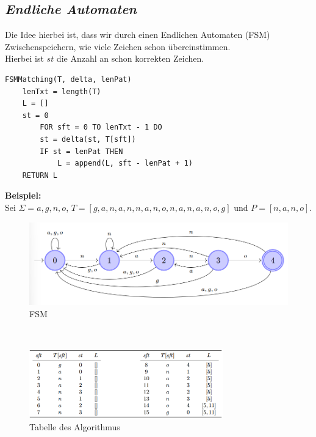 \documentclass{article}
\begin{document}
        \subsection{\textit{Endliche Automaten}}
            Die Idee hierbei ist, dass wir durch einen Endlichen Automaten (FSM) Zwischenspeichern, wie viele Zeichen schon übereinstimmen. \\
            Hierbei ist $st$ die Anzahl an schon korrekten Zeichen. 
            \begin{lstlisting}[style=pseudocode]
FSMMatching(T, delta, lenPat)
    lenTxt = length(T)
    L = []
    st = 0
        FOR sft = 0 TO lenTxt - 1 DO
        st = delta(st, T[sft])
        IF st = lenPat THEN
            L = append(L, sft - lenPat + 1)
    RETURN L
            \end{lstlisting}
            \textbf{Beispiel:}\\
            Sei $\Sigma= {a,g,n,o}$, $T= [g,a,n,a,n,n,a,n,o,n,a,n,a,n,o,g]$ und $P= [n,a,n,o]$.\\
            \begin{figure}[ht]
                \centering
                \includegraphics[width=1.0\textwidth]{Bilder/FSM.png}
                \caption{FSM}
                \label{fig:FSM}
            \end{figure}\\
            \begin{figure}[ht]
                \centering
                \includegraphics[width=0.75\textwidth]{Bilder/StringMatching2.png}
                \caption{Tabelle des Algorithmus}
                \label{fig:StringMatching2}
            \end{figure}\\
\end{document}
